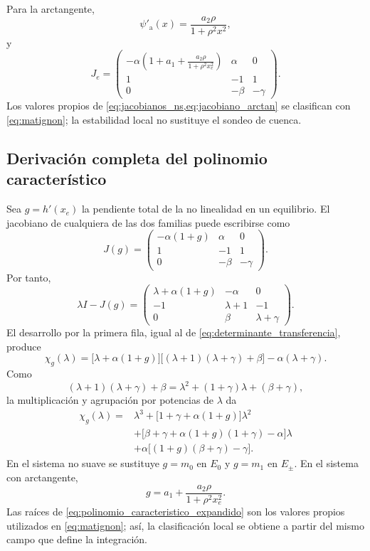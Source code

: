 Para la arctangente,
\[
\psi'_{\mathrm a}(x)
=\frac{a_2\rho}{1+\rho^2x^2},
\]
y
\begin{equation}
J_e=
\begin{pmatrix}
\displaystyle
-\alpha\left(1+a_1+
\frac{a_2\rho}{1+\rho^2x_e^2}\right)
&\alpha&0\\[3mm]
1&-1&1\\
0&-\beta&-\gamma
\end{pmatrix}.
\label{eq:jacobiano_arctan}
\end{equation}
Los valores propios de
\cref{eq:jacobianos_ns,eq:jacobiano_arctan} se clasifican con
\cref{eq:matignon}; la estabilidad local no sustituye el sondeo de cuenca.

\fi
\ifnum{}\relax
\subsection{Derivación completa del polinomio característico}
\label{app:polinomio_caracteristico}

Sea \(g=h'(x_e)\) la pendiente total de la no linealidad en un equilibrio.
El jacobiano de cualquiera de las dos familias puede escribirse como
\begin{equation}
J(g)=
\begin{pmatrix}
-\alpha(1+g)&\alpha&0\\
1&-1&1\\
0&-\beta&-\gamma
\end{pmatrix}.
\label{eq:jacobiano_pendiente_total}
\end{equation}
Por tanto,
\[
\lambda I-J(g)=
\begin{pmatrix}
\lambda+\alpha(1+g)&-\alpha&0\\
-1&\lambda+1&-1\\
0&\beta&\lambda+\gamma
\end{pmatrix}.
\]
El desarrollo por la primera fila, igual al de
\cref{eq:determinante_transferencia}, produce
\begin{equation}
\chi_g(\lambda)
=\bigl[\lambda+\alpha(1+g)\bigr]
\bigl[(\lambda+1)(\lambda+\gamma)+\beta\bigr]
-\alpha(\lambda+\gamma).
\label{eq:polinomio_caracteristico_agrupado}
\end{equation}
Como
\[
(\lambda+1)(\lambda+\gamma)+\beta
=\lambda^2+(1+\gamma)\lambda+(\beta+\gamma),
\]
la multiplicación y agrupación por potencias de \(\lambda\) da
\begin{equation}
\begin{aligned}
\chi_g(\lambda)
={}&\lambda^3+
\bigl[1+\gamma+\alpha(1+g)\bigr]\lambda^2\\
&+\bigl[
\beta+\gamma+\alpha(1+g)(1+\gamma)-\alpha
\bigr]\lambda\\
&+\alpha\bigl[(1+g)(\beta+\gamma)-\gamma\bigr].
\end{aligned}
\label{eq:polinomio_caracteristico_expandido}
\end{equation}
En el sistema no suave se sustituye \(g=m_0\) en \(E_0\) y \(g=m_1\)
en \(E_\pm\). En el sistema con arctangente,
\[
g=a_1+\frac{a_2\rho}{1+\rho^2x_e^2}.
\]
Las raíces de \cref{eq:polinomio_caracteristico_expandido} son los valores
propios utilizados en \cref{eq:matignon}; así, la clasificación local se
obtiene a partir del mismo campo que define la integración.

